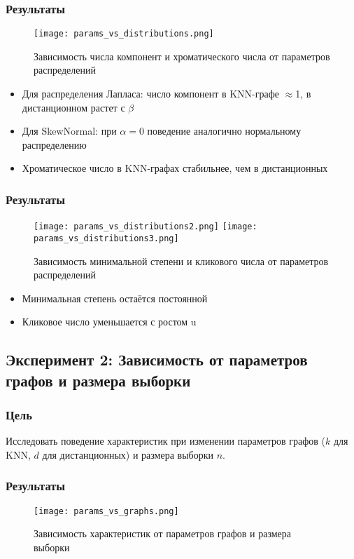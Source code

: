 \documentclass[a4paper, 12pt]{article}
\begin{document}
\subsubsection{Результаты}
\begin{figure}[H]
    \centering
    \texttt{[image: params\_vs\_distributions.png]}
    \caption{Зависимость числа компонент и хроматического числа от параметров распределений}
\end{figure}

\begin{itemize}
    \item Для распределения Лапласа: число компонент в KNN-графе $\approx$1, в дистанционном растет с $\beta$
    \item Для SkewNormal: при $\alpha=0$ поведение аналогично нормальному распределению
    \item Хроматическое число в KNN-графах стабильнее, чем в дистанционных
\end{itemize}

\subsubsection{Результаты}
\begin{figure}[H]
    \centering
    \texttt{[image: params\_vs\_distributions2.png]}
    \texttt{[image: params\_vs\_distributions3.png]}
    \caption{Зависимость минимальной степени и кликового числа от параметров распределений}
\end{figure}

\begin{itemize}
    \item Минимальная степень остаётся постоянной
    \item Кликовое число уменьшается с ростом u
\end{itemize}

\subsection{Эксперимент 2: Зависимость от параметров графов и размера выборки}
\subsubsection{Цель}
Исследовать поведение характеристик при изменении параметров графов ($k$ для KNN, $d$ для дистанционных) и размера выборки $n$.

\subsubsection{Результаты}
\begin{figure}[H]
    \centering
    \texttt{[image: params\_vs\_graphs.png]}
    \caption{Зависимость характеристик от параметров графов и размера выборки}
\end{figure}
\end{document}
